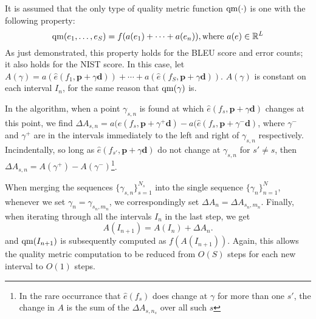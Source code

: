 \documentclass[12pt]{amsart}
\newcommand{\qm}{{\rm qm}}
\begin{document}
It is assumed that the only type of quality metric function $\qm(\cdot)$ is one with the following property:
\[ \qm(e_1, \dots , e_S) = f(a(e_1) + \cdots + a(e_n)), \text{where $a(e) \in \mathbb{R}^L$} \]
As just demonstrated, this property holds for the BLEU score and error counts; it also holds for the NIST score.
In this case, let $A(\gamma) = a(\hat{e}(f_1, \boldsymbol{p} + \gamma \boldsymbol{d})) + \cdots + a(\hat{e}(f_S, \boldsymbol{p} + \gamma \boldsymbol{d}))$.
$A(\gamma)$ is constant on each interval $I_n$, for the same reason that $\qm(\gamma)$ is.

In the algorithm, when a point $\gamma_{s, n}$ is found at which $\hat{e}(f_s, \boldsymbol{p} + \gamma \boldsymbol{d})$ changes at this point, we find $\Delta A_{s, n} = a(\hat{e}(f_s, \boldsymbol{p} + \gamma^+ \boldsymbol{d}) - a(\hat{e}(f_s, \boldsymbol{p} + \gamma^- \boldsymbol{d})$, where $\gamma^-$ and $\gamma^+$ are in the intervals immediately to the left and right of $\gamma_{s, n}$ respectively.
Incindentally, so long as $\hat{e}(f_{s'}, \boldsymbol{p} + \gamma \boldsymbol{d})$ do not change at $\gamma_{s, n}$ for $s' \neq s$, then $\Delta A_{s, n} = A(\gamma^+) - A(\gamma^-)$\footnote{In the rare occurrance that $\hat{e}(f_{s})$ does change at $\gamma$ for more than one $s'$, the change in $A$ is the sum of the $\Delta A_{s, n_s}$ over all such $s$}.

When merging the sequences $\{\gamma_{s, n}\}_{s=1}^{N_s}$ into the single sequence $\{\gamma_n\}_{n=1}^N$, whenever we set $\gamma_n = \gamma_{s_n, m_n}$, we correspondingly set $\Delta A_n = \Delta A_{s_n, m_n}$.
Finally, when iterating through all the intervals $I_n$ in the last step, we get
\[ A(I_{n+1}) = A(I_n) + \Delta A_n. \]
and $\qm(I_{n+1})$ is subsequently computed as $f(A(I_{n+1}))$.
Again, this allows the quality metric computation to be reduced from $O(S)$ steps for each new interval to $O(1)$ steps.
\end{document}
